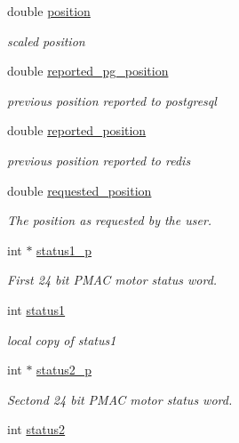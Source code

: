 \begin{DoxyCompactItemize}
double \hyperlink{structlspmac__motor__struct_af8ffb3aed907d8664b65b37601954411}{position}
\begin{DoxyCompactList}\small\item\em scaled position \end{DoxyCompactList}\item 
double \hyperlink{structlspmac__motor__struct_a959bd55eb5c88a30cd4873ea567944d8}{reported\-\_\-pg\-\_\-position}
\begin{DoxyCompactList}\small\item\em previous position reported to postgresql \end{DoxyCompactList}\item 
double \hyperlink{structlspmac__motor__struct_ae5f1f605a0f587500e627332ad4e5e7e}{reported\-\_\-position}
\begin{DoxyCompactList}\small\item\em previous position reported to redis \end{DoxyCompactList}\item 
double \hyperlink{structlspmac__motor__struct_af8cdc94c6e2478b12ce942d4cf1d7499}{requested\-\_\-position}
\begin{DoxyCompactList}\small\item\em The position as requested by the user. \end{DoxyCompactList}\item 
int $\ast$ \hyperlink{structlspmac__motor__struct_a56c41875faf19c643e97c10519e6eb8c}{status1\-\_\-p}
\begin{DoxyCompactList}\small\item\em First 24 bit P\-M\-A\-C motor status word. \end{DoxyCompactList}\item 
int \hyperlink{structlspmac__motor__struct_acb52b612b9237e8eec0b97fb1e76a35d}{status1}
\begin{DoxyCompactList}\small\item\em local copy of status1 \end{DoxyCompactList}\item 
int $\ast$ \hyperlink{structlspmac__motor__struct_a2b33ef6e12717459c1e9967cc6e659c6}{status2\-\_\-p}
\begin{DoxyCompactList}\small\item\em Sectond 24 bit P\-M\-A\-C motor status word. \end{DoxyCompactList}\item 
int \hyperlink{structlspmac__motor__struct_a6a412224c09268c1dc92de9c2a1a2512}{status2}

\end{DoxyCompactItemize}
